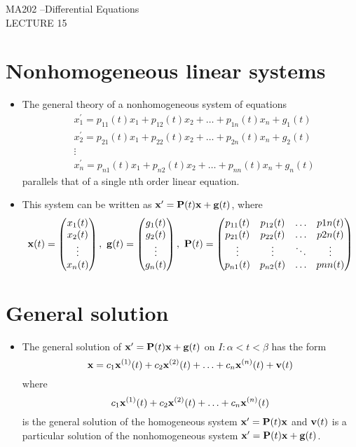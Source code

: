 \documentclass[11pt,a4paper]{article}
\begin{document}
	\begin{center}
		\vspace*{8cm}
		\Huge MA202 –Differential Equations\\
		\LARGE LECTURE 15
  \end{center}
  \newpage
	\section*{Nonhomogeneous linear systems}
	\begin{itemize}
		\item The general theory of a nonhomogeneous system of equations
		\begin{align*}
			&x_1^\prime = p_{11}(t)x_1 + p_{12}(t)x_2 + \ldots + p_{1n}(t)x_n + g_1(t)\\
			&x_2^\prime = p_{21}(t)x_1 + p_{22}(t)x_2 + \ldots + p_{2n}(t)x_n + g_2(t)\\
			&\vdots\\
			&x_n^\prime = p_{n1}(t)x_1 + p_{n2}(t)x_2 + \ldots + p_{nn}(t)x_n + g_n(t)
		\end{align*}
		parallels that of a single nth order linear equation. 
		\item This system can be written as $\vb{x}^\prime = \vb{P}(t)\vb{x} + \vb{g}(t)$, where
		$$
		\vb{x}(t)=
		\begin{pmatrix}
			x_1(t)\\
			x_2(t)\\
			\vdots\\
			x_n(t)
		\end{pmatrix},\ \vb{g}(t) =
		\begin{pmatrix}
			g_1(t)\\
			g_2(t)\\
			\vdots\\
			g_n(t)
		\end{pmatrix},\ \vb{P}(t) =
		\begin{pmatrix}
			p_{11}(t) & p_{12}(t) & \ldots & p{1n}(t)\\
			p_{21}(t) & p_{22}(t) & \ldots & p{2n}(t)\\
			\vdots & \vdots & \ddots & \vdots\\
			p_{n1}(t) & p_{n2}(t) & \ldots & p{nn}(t)
		\end{pmatrix}
		$$
	\end{itemize}
	\section*{General solution}
	\begin{itemize}
		\item The general solution of $\vb{x}^\prime = \vb{P}(t)\vb{x} + \vb{g}(t)$ on $I: \alpha < t < \beta$ has the form
		$$
		\vb{x} = c_1\vb{x}^{(1)}(t) + c_2\vb{x}^{(2)}(t) + \ldots + c_n\vb{x}^{(n)}(t) + \vb{v}(t)
		$$
		where
		$$
		c_1\vb{x}^{(1)}(t) + c_2\vb{x}^{(2)}(t) + \ldots + c_n\vb{x}^{(n)}(t)
		$$
		is the general solution of the homogeneous system $\vb{x}^\prime = \vb{P}(t)\vb{x}$ and $\vb{v}(t)$ is a particular solution of the nonhomogeneous system $\vb{x}^\prime = \vb{P}(t)\vb{x} + \vb{g}(t)$.
	\end{itemize}
\end{document}
